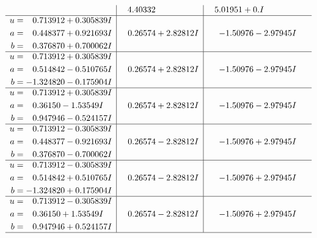 \documentclass[1p]{elsarticle_modified}
\theoremstyle{definition}
\begin{document}
$$\begin{array}{c|c|c}
 & \phantom{-}4.40332\phantom{ +0.000000I} & \phantom{-}5.01951 + 0. I\phantom{ +0.000000I} \\ \hline\begin{aligned}
u &= \phantom{-}0.713912 + 0.305839 I \\
a &= \phantom{-}0.448377 + 0.921693 I \\
b &= \phantom{-}0.376870 + 0.700062 I\end{aligned}
 & \phantom{-}0.26574 + 2.82812 I & -1.50976 - 2.97945 I \\ \hline\begin{aligned}
u &= \phantom{-}0.713912 + 0.305839 I \\
a &= \phantom{-}0.514842 - 0.510765 I \\
b &= -1.324820 - 0.175904 I\end{aligned}
 & \phantom{-}0.26574 + 2.82812 I & -1.50976 - 2.97945 I \\ \hline\begin{aligned}
u &= \phantom{-}0.713912 + 0.305839 I \\
a &= \phantom{-}0.36150 - 1.53549 I \\
b &= \phantom{-}0.947946 - 0.524157 I\end{aligned}
 & \phantom{-}0.26574 + 2.82812 I & -1.50976 - 2.97945 I \\ \hline\begin{aligned}
u &= \phantom{-}0.713912 - 0.305839 I \\
a &= \phantom{-}0.448377 - 0.921693 I \\
b &= \phantom{-}0.376870 - 0.700062 I\end{aligned}
 & \phantom{-}0.26574 - 2.82812 I & -1.50976 + 2.97945 I \\ \hline\begin{aligned}
u &= \phantom{-}0.713912 - 0.305839 I \\
a &= \phantom{-}0.514842 + 0.510765 I \\
b &= -1.324820 + 0.175904 I\end{aligned}
 & \phantom{-}0.26574 - 2.82812 I & -1.50976 + 2.97945 I \\ \hline\begin{aligned}
u &= \phantom{-}0.713912 - 0.305839 I \\
a &= \phantom{-}0.36150 + 1.53549 I \\
b &= \phantom{-}0.947946 + 0.524157 I\end{aligned}
 & \phantom{-}0.26574 - 2.82812 I & -1.50976 + 2.97945 I\\
 \hline 
 \end{array}$$\newpage\newpage\renewcommand{\arraystretch}{1}
\end{document}
